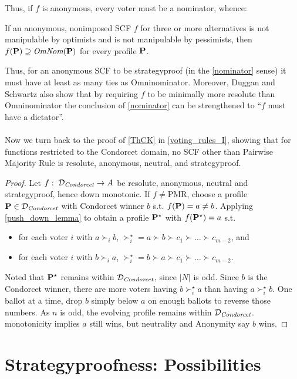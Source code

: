 Thus, if $f$ is anonymous, every voter must be a nominator, whence:

\begin{corollary}
    If an anonymous, nonimposed SCF $f$ for three or more alternatives is not manipulable by optimists and is not manipulable by pessimists, then $f (\mathbf{P}) \supseteq \textit{OmNom}(\mathbf{P})$ for every profile $\mathbf{P}$.
\end{corollary}

Thus, for an anonymous SCF to be strategyproof (in the \cref{nominator} sense) it must have at least as many ties as Omninominator. Moreover, Duggan and Schwartz also show that by requiring $f$ to be minimally more resolute than Omninominator the conclusion of \cref{nominator} can be strengthened to ``$f$ must have a dictator''.\\
~\\
Now we turn back to the proof of \cref{ThCK} in \cref{voting_rules_I}, showing that for functions restricted to the Condorcet domain, no SCF other than Pairwise Majority Rule is resolute, anonymous, neutral, and strategyproof.

\begin{proof}
    \label{second_part_ThCK}
    Let $f:\; \mathcal{D}_\textit{Condorcet} \to A$ be resolute, anonymous, neutral and strategyproof, hence down monotonic. If $f \neq \mbox{PMR}$, choose a profile $\mathbf{P} \in \mathcal{D}_\textit{Condorcet}$ with Condorcet winner $b$ s.t. $f(\mathbf{P}) = a \neq b$. Applying \cref{push_down_lemma} to obtain a profile $\mathbf{P}^\star$ with $f(\mathbf{P}^\star) = a$ s.t. 
    \begin{itemize}
        \item for each voter $i$ with $a \succ_i b$, $\succ^\star_i = a \succ b \succ c_1 \succ \dots \succ c_{m-2}$, and
        \item for each voter $i$ with $b \succ_i a$, $\succ^\star_i = b \succ a \succ c_1 \succ \dots \succ c_{m-2}$.
    \end{itemize}
    Noted that $\mathbf{P}^\star$ remains within $\mathcal{D}_\textit{Condorcet}$, since $|N|$ is odd. Since $b$ is the Condorcet winner, there are more voters having $b \succ^\star_i a$ than having $a \succ^\star_i b$. One ballot at a time, drop $b$ simply below $a$ on enough ballots to reverse those numbers. As $n$ is odd, the evolving profile remains within $\mathcal{D}_\textit{Condorcet}$. monotonicity implies $a$ still wins, but neutrality and Anonymity say $b$ wins.
\end{proof}

\section{Strategyproofness: Possibilities}